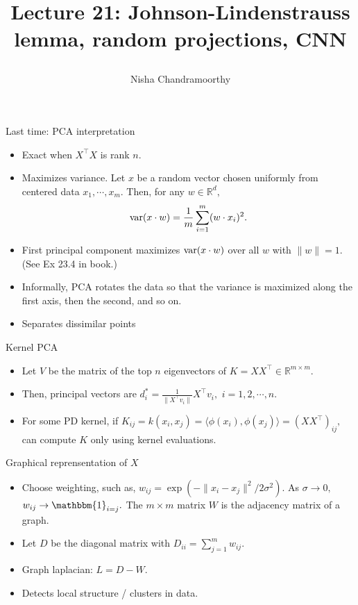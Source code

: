 \documentclass[final]{beamer}
\title{\begin{huge}{Lecture 21: Johnson-Lindenstrauss lemma, random projections, CNN}\end{huge}} %
\author{Nisha Chandramoorthy} %
\begin{document}
\frame{\titlepage}

\begin{frame}{Last time: PCA interpretation}
	\begin{itemize}
		\item Exact when $X^\top X$ is rank $n.$
		\pause
	\item Maximizes variance. Let $x$ be a random vector chosen uniformly from centered data $x_1,\cdots,x_m.$ Then, for any $w \in \mathbb{R}^d,$ 
		$${\rm var}(x\cdot w) = \dfrac{1}{m}\sum_{i=1}^m (w\cdot x_i)^2.$$
	\pause
\item First principal component maximizes ${\rm var}(x\cdot w)$ over all $w$ with $\|w\| = 1.$ (See Ex 23.4 in book.)
	\pause
	\item Informally, PCA rotates the data so that the variance is maximized along the first axis, then the second, and so on.
	\pause
	\item Separates dissimilar points
			
	\end{itemize}
\end{frame}
\begin{frame}{Kernel PCA}
	\begin{itemize}
		\item Let $V$ be the matrix of the top $n$ eigenvectors of $K = X X^\top \in \mathbb{R}^{m\times m}.$ 
		\pause
		\item Then, principal vectors are $d^*_i = \frac{1}{\|X^\top v_i\|} X^\top v_i,$ $i = 1,2,\cdots,n.$
		\pause
		\item For some PD kernel, if $K_{ij} = k(x_i,x_j) = \langle \phi(x_i), \phi(x_j)\rangle = (X X^\top)_{ij},$ can compute $K$ only using kernel evaluations.
		
	\end{itemize}
\end{frame}
\begin{frame}{Graphical reprensentation of $X$}
	\begin{itemize}
		\item Choose weighting, such as, $w_{ij} = \exp(-\|x_i - x_j\|^2/2\sigma^2).$ As $\sigma \to 0,$ $w_{ij} \to \mathbbm{1}_{i=j}.$ The $m \times m$ matrix $W$ is the adjacency matrix of a graph.
		\pause
		\item Let $D$ be the diagonal matrix with $D_{ii} = \sum_{j=1}^m w_{ij}.$
		\pause 
		\item Graph laplacian: $L = D - W.$
		\pause 
		\item Detects local structure / clusters in data.

	\end{itemize}

\end{frame}
\end{document}
